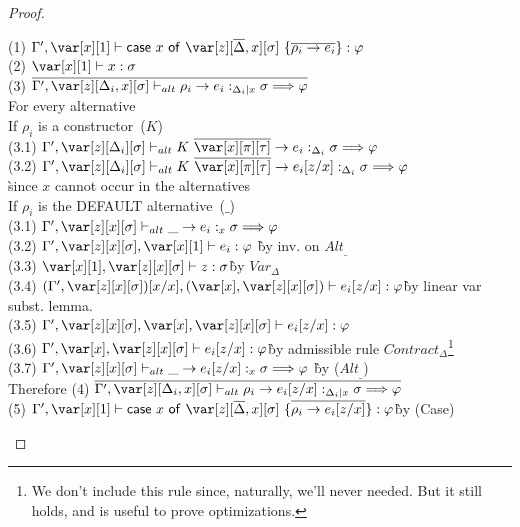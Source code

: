 \BinderSwapTheorem

%
%
%
%

\begin{proof}~

\begin{tabbing}
    (1) $\G', \xl \vdash \ccase{x}{\z[\ov{\D},x][\s]~\{\ov{\rho_i\to e_i}\}} : \vp$\\
    (2) $\xl \vdash x : \sigma$\\
    (3) $\ov{\G',\z[\D_i,x][\s] \vdash_{alt} \rho_i \rightarrow e_i :_{\D_i | x} \s \Longrightarrow \vp}$\\
    For every alternative\\
    If $\rho_i$ is a constructor~($K$)\\
    (3.1) $\G',\z[\D_i][\s] \vdash_{alt} K~\ov{\x[\pi][\tau]} \rightarrow e_i :_{\D_i} \s \Longrightarrow \vp$\\
    (3.2) $\G',\z[\D_i][\s] \vdash_{alt} K~\ov{\x[\pi][\tau]} \rightarrow e_i[z/x] :_{\D_i} \s \Longrightarrow \vp$\\
    \` since $x$ cannot occur in the alternatives\\
    If $\rho_i$ is the DEFAULT alternative~($\_$)\\
    (3.1) $\G',\z[x][\s] \vdash_{alt} \_ \to e_i :_{x} \s \Longrightarrow \vp$\\
    (3.2) $\G',\z[x][\s],\xl \vdash e_i : \vp$ \` by inv. on $Alt_{\_}$\\
    (3.3) $\xl,\z[x][\s] \vdash z : \s$\` by $Var_\Delta$\\
    (3.4) $(\G',\z[x][\s])[x / x], (\x,\z[x][\s]) \vdash e_i[z/x] : \vp$\`by linear var subst. lemma.\\
    (3.5) $\G',\z[x][\s], \x, \z[x][\s] \vdash e_i[z/x] : \vp$\\
    (3.6) $\G', \x, \z[x][\s] \vdash e_i[z/x] : \vp$\` by admissible rule $Contract_\Delta$\footnote{We don't include this rule since, naturally, we'll never needed. But it still holds, and is useful to prove optimizations.} \\
    (3.7) $\G',\z[x][\s] \vdash_{alt} \_ \to e_i[z/x] :_{x} \s \Longrightarrow \vp$ \` by ($Alt_\_$)\\
    Therefore
    (4) $\ov{\G',\z[\D_i,x][\s] \vdash_{alt} \rho_i \rightarrow e_i[z/x] :_{\D_i | x} \s \Longrightarrow \vp}$\\
    (5) $\G', \xl \vdash \ccase{x}{\z[\ov{\D},x][\s]~\{\ov{\rho_i\to e_i[z/x]}\}} : \vp$\` by (Case)\\

\end{tabbing}
\end{proof}


